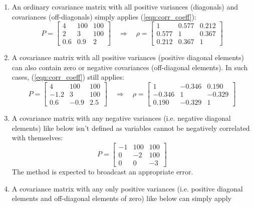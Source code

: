 \documentclass[11pt,fleqn]{report}
\begin{document}
\begin{enumerate}
\item{
An ordinary covariance matrix with all positive variances (diagonals) and
covariances (off-diagonals) simply applies
(\ref{eqn:corr_coeff}):
\begin{equation*}
P = 
\begin{bmatrix}
4 & 100 & 100 \\
2 & 3 & 100 \\
0.6 & 0.9 & 2
\end{bmatrix} \quad \Longrightarrow \quad 
\rho = 
\begin{bmatrix}
1 & 0.577 & 0.212 \\
0.577 & 1 & 0.367 \\
0.212 & 0.367 & 1
\end{bmatrix}
\end{equation*}
}
\item{
A covariance matrix with all positive variances (positive diagonal elements) can also
contain zero or negative covariances (off-diagonal elements). In such cases, 
(\ref{eqn:corr_coeff}) still applies:
\begin{equation*}
P = 
\begin{bmatrix}
4 & 100 & 100 \\
-1.2 & 3 & 100 \\
0.6 & -0.9 & 2.5
\end{bmatrix} \quad \Longrightarrow \quad 
\rho = 
\begin{bmatrix}
1 & -0.346 & 0.190 \\
-0.346 & 1 & -0.329 \\
0.190 & -0.329 & 1
\end{bmatrix}
\end{equation*}
}
\item{
A covariance matrix with any negative variances (i.e. negative diagonal elements) 
like below isn't defined as variables cannot be
negatively correlated with themselves:
\begin{equation*}
P = 
\begin{bmatrix}
-1 & 100 & 100 \\
0 & -2 & 100 \\
0 & 0 & -3
\end{bmatrix} 
\end{equation*}
The method is expected to broadcast an appropriate error.
}
\item{
A covariance matrix with any only positive variances (i.e. positive diagonal elements
and off-diagonal elements of zero) like below can simply apply 
}
\end{enumerate}
\end{document}
